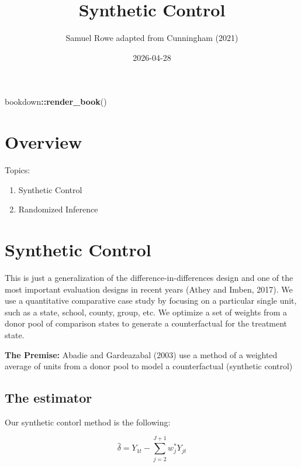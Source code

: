 \documentclass[
]{book}
\title{Synthetic Control}
\author{Samuel Rowe adapted from Cunningham (2021)}
\date{2026-04-28}
\newenvironment{Shaded}{\begin{snugshade}}{\end{snugshade}}
\newcommand{\FunctionTok}[1]{\textcolor[rgb]{0.13,0.29,0.53}{\textbf{#1}}}
\newcommand{\NormalTok}[1]{#1}
\newcommand{\SpecialCharTok}[1]{\textcolor[rgb]{0.81,0.36,0.00}{\textbf{#1}}}
\providecommand{\tightlist}{%
  \setlength{\itemsep}{0pt}\setlength{\parskip}{0pt}}
\begin{document}
\maketitle

{
\setcounter{tocdepth}{1}
\tableofcontents
}
\begin{Shaded}
\begin{Highlighting}[]
\NormalTok{bookdown}\SpecialCharTok{::}\FunctionTok{render\_book}\NormalTok{()}
\end{Highlighting}
\end{Shaded}

\chapter*{Overview}\label{overview}

Topics:

\begin{enumerate}
\def\labelenumi{\arabic{enumi}.}
\tightlist
\item
  Synthetic Control
\item
  Randomized Inference
\end{enumerate}

\chapter{Synthetic Control}\label{synthetic-control}

This is just a generalization of the difference-in-differences design and one of the most important evaluation designs in recent years (Athey and Imben, 2017). We use a quantitative comparative case study by focusing on a particular single unit, such as a state, school, county, group, etc. We optimize a set of weights from a donor pool of comparison states to generate a counterfactual for the treatment state.

\textbf{The Premise:} Abadie and Gardeazabal (2003) use a method of a weighted average of units from a donor pool to model a counterfactual (synthetic control)

\section{The estimator}\label{the-estimator}

Our synthetic contorl method is the following:

\[ \hat{\delta} = Y_{1t}-\sum^{J+1}_{j=2}w^*_jY_{jt} \]
\end{document}
